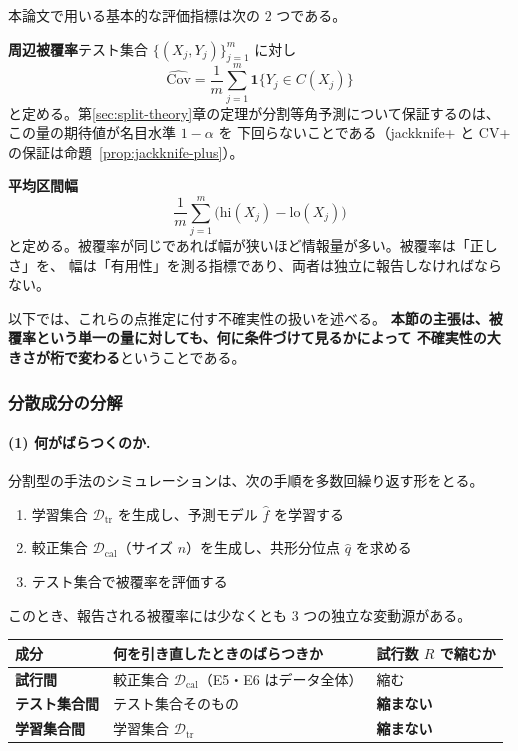 \documentclass[a4paper,11pt]{jsarticle}
\theoremstyle{definition}
\theoremstyle{plain}
\theoremstyle{remark}
\newcommand{\Ind}{\mathbf{1}}                  %
\newcommand{\Dtr}{\mathcal{D}_{\mathrm{tr}}}     %
\newcommand{\Dcal}{\mathcal{D}_{\mathrm{cal}}}   %
\newcommand{\qhat}{\hat{q}}
\newcommand{\fhat}{\hat{f}}
\begin{document}
本論文で用いる基本的な評価指標は次の $2$ つである。

\textbf{周辺被覆率}\quad テスト集合 $\{(X_j,Y_j)\}_{j=1}^{m}$ に対し
\begin{equation}
  \label{eq:coverage-rate}
  \widehat{\mathrm{Cov}}=\frac1m\sum_{j=1}^{m}\Ind\bigl\{Y_j\in C(X_j)\bigr\}
\end{equation}
と定める。第\ref{sec:split-theory}章の定理が分割等角予測について保証するのは、この量の期待値が名目水準 $1-\alpha$ を
下回らないことである（jackknife+ と CV+ の保証は命題~\ref{prop:jackknife-plus}）。

\textbf{平均区間幅}\quad
\begin{equation}
  \label{eq:mean-width}
  \frac1m\sum_{j=1}^{m}\bigl(\mathrm{hi}(X_j)-\mathrm{lo}(X_j)\bigr)
\end{equation}
と定める。被覆率が同じであれば幅が狭いほど情報量が多い。被覆率は「正しさ」を、
幅は「有用性」を測る指標であり、両者は独立に報告しなければならない。

以下では、これらの点推定に付す不確実性の扱いを述べる。
\textbf{本節の主張は、被覆率という単一の量に対しても、何に条件づけて見るかによって
不確実性の大きさが桁で変わる}ということである。

\subsubsection{分散成分の分解}

\paragraph{(1) 何がばらつくのか.}
分割型の手法のシミュレーションは、次の手順を多数回繰り返す形をとる。
\begin{enumerate}
  \item 学習集合 $\Dtr$ を生成し、予測モデル $\fhat$ を学習する
  \item 較正集合 $\Dcal$（サイズ $n$）を生成し、共形分位点 $\qhat$ を求める
  \item テスト集合で被覆率を評価する
\end{enumerate}
このとき、報告される被覆率には少なくとも $3$ つの独立な変動源がある。

\begin{center}
  \begin{tabular}{lll}
    \toprule
    成分 & 何を引き直したときのばらつきか & 試行数 $R$ で縮むか \\
    \midrule
    \textbf{試行間} & 較正集合 $\Dcal$（E5・E6 はデータ全体） & 縮む \\
    \textbf{テスト集合間} & テスト集合そのもの & \textbf{縮まない} \\
    \textbf{学習集合間} & 学習集合 $\Dtr$ & \textbf{縮まない} \\
    \bottomrule
  \end{tabular}
\end{center}
\end{document}
